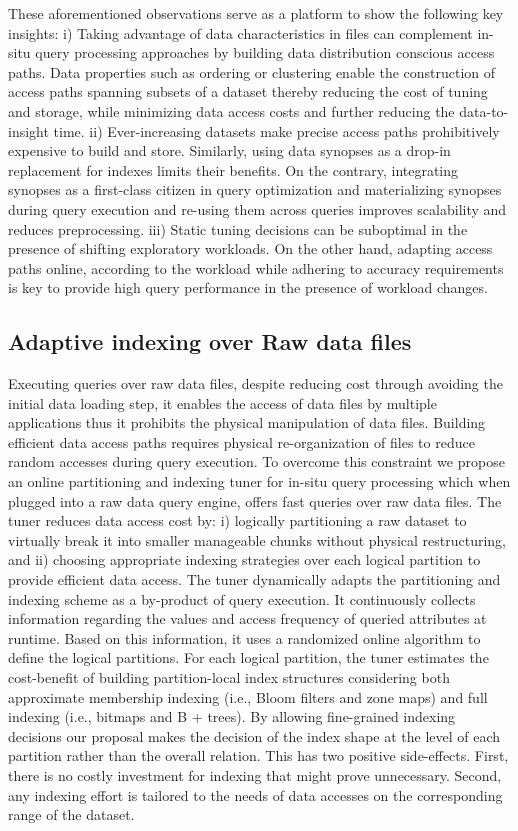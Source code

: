 These aforementioned observations serve as a platform to show the 
following key insights:
i) Taking advantage of data characteristics in files can complement 
in-situ query processing approaches by building data distribution 
conscious access paths. Data properties such as ordering or 
clustering enable the construction of access paths spanning subsets of
a dataset thereby reducing the cost of tuning and storage, while minimizing 
data access costs and further reducing the data-to-insight time.
ii) Ever-increasing datasets make precise access paths prohibitively 
expensive to build and store. Similarly, using data synopses as a 
drop-in replacement for indexes limits their benefits. On the 
contrary, integrating synopses as a first-class citizen in query
optimization and materializing synopses during query execution and 
re-using them across queries improves scalability and reduces 
preprocessing.
iii) Static tuning decisions can be suboptimal in the presence of 
shifting exploratory workloads. On the other hand, adapting access 
paths online, according to the workload while adhering to accuracy 
requirements is key to provide high query performance in the
presence of workload changes.

\subsection{Adaptive indexing over Raw data files}

Executing queries over raw data files, despite reducing cost through 
avoiding the initial data loading step, it enables the access of data 
files by multiple applications thus it prohibits the physical 
manipulation of data files. 
Building efficient data access paths requires physical 
re-organization of files to reduce random accesses during query 
execution. To overcome this constraint we propose an online 
partitioning and indexing tuner for in-situ query processing which 
when plugged into a raw data query engine, offers fast queries over 
raw data files. The tuner reduces data access cost by: 
i) logically partitioning a raw dataset to virtually break it
into smaller manageable chunks without physical restructuring, and 
ii) choosing appropriate indexing strategies over each logical 
partition to provide efficient data access. 
The tuner dynamically adapts the partitioning and indexing scheme as a 
by-product  of query execution.
It continuously collects information regarding the values and access 
frequency of queried attributes at runtime. Based on this 
information, it uses a randomized online algorithm to define the 
logical partitions. For each logical partition, the tuner estimates 
the cost-benefit of building partition-local index structures 
considering both approximate membership indexing
(i.e., Bloom filters and zone maps) and full indexing (i.e., bitmaps 
and B + trees). By allowing fine-grained indexing decisions our 
proposal makes the decision of the index shape at the level of each 
partition rather than the overall relation. This has two positive 
side-effects. First, there is no costly investment for indexing that 
might prove unnecessary. Second, any indexing effort is tailored to 
the needs of data accesses on the corresponding range of the dataset.

